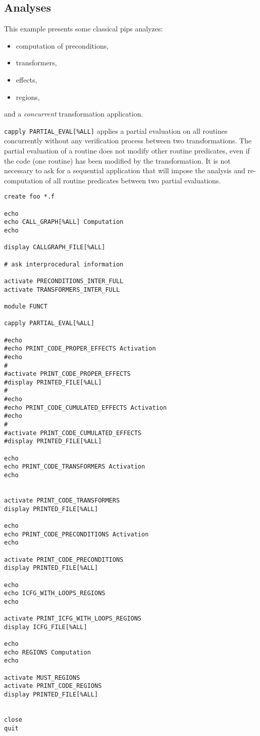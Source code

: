 \documentclass[a4paper,12pt]{article}
\begin{document}
\subsection{Analyses}
\label{exm4}
This example presents some classical pips analyzes: 

\begin{itemize}
\item computation of preconditions,
\item transformers, 
\item effects,
\item regions, 
\end{itemize}
and a {\it concurrent} transformation
application.  

\verb+capply PARTIAL_EVAL[%ALL]+ 
applies a partial evaluation on all routines concurrently without any
verification process between two transformations. The partial evaluation
of a routine does not modify other routine predicates, even if the code
(one routine) has been modified by the transformation. It is not
necessary to ask for a sequential application that will impose the
analysis and re-computation of all routine predicates between two partial
evaluations.

\begin{verbatim}
create foo *.f

echo
echo CALL_GRAPH[%ALL] Computation
echo

display CALLGRAPH_FILE[%ALL]

# ask interprocedural information

activate PRECONDITIONS_INTER_FULL
activate TRANSFORMERS_INTER_FULL

module FUNCT

capply PARTIAL_EVAL[%ALL]

#echo
#echo PRINT_CODE_PROPER_EFFECTS Activation
#echo
#
#activate PRINT_CODE_PROPER_EFFECTS
#display PRINTED_FILE[%ALL]
#
#echo
#echo PRINT_CODE_CUMULATED_EFFECTS Activation
#echo
#
#activate PRINT_CODE_CUMULATED_EFFECTS
#display PRINTED_FILE[%ALL]

echo
echo PRINT_CODE_TRANSFORMERS Activation
echo


activate PRINT_CODE_TRANSFORMERS
display PRINTED_FILE[%ALL]

echo
echo PRINT_CODE_PRECONDITIONS Activation
echo

activate PRINT_CODE_PRECONDITIONS
display PRINTED_FILE[%ALL]

echo
echo ICFG_WITH_LOOPS_REGIONS
echo 

activate PRINT_ICFG_WITH_LOOPS_REGIONS
display ICFG_FILE[%ALL]

echo 
echo REGIONS Computation
echo

activate MUST_REGIONS
activate PRINT_CODE_REGIONS
display PRINTED_FILE[%ALL]


close 
quit
\end{verbatim}
\end{document}
